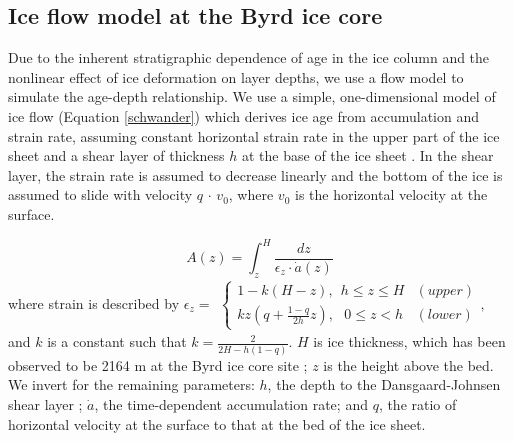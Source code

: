 \subsection{Ice flow model at the Byrd ice core}

Due to the inherent stratigraphic dependence of age in the ice column and the nonlinear effect of ice deformation on layer depths, we use a flow model to simulate the age-depth relationship. We use a simple, one-dimensional model of ice flow (Equation \ref{schwander}) which derives ice age from accumulation and strain rate, assuming constant horizontal strain rate in the upper part of the ice sheet and a shear layer of thickness $h$ at the base of the ice sheet \citep{schwander2001}. In the shear layer, the strain rate is assumed to decrease linearly and the bottom of the ice is assumed to slide with velocity $q$ $\cdot$ $v_0$, where $v_0$ is the horizontal velocity at the surface.

\begin{equation}\label{schwander}
A(z) = \int_{z}^{H} \frac{dz}{\epsilon_z \cdot \dot{a}(z)}
\end{equation}
where strain is described by
$    \epsilon_z=
	\begin{aligned}
    \begin{cases}
                 1-k(H-z), \:\:  h \leq z \leq H  & (upper) \\
                  kz(q+\frac{1-q}{2h}z), \:\:\: 0 \leq z < h &(lower)
    \end{cases}, 
    \end{aligned}
$
and $k$ is a constant such that $k = \frac{2}{2H - h(1-q)}$. $H$ is ice thickness, which has been observed to be 2164 m at the Byrd ice core site \citep{gow1968}; $z$ is the height above the bed. We invert for the remaining parameters: $h$, the depth to the Dansgaard-Johnsen shear layer \citep{dansgaardjohnsen1969}; $\dot{a}$, the time-dependent accumulation rate; and $q$, the ratio of horizontal velocity at the surface to that at the bed of the ice sheet.

